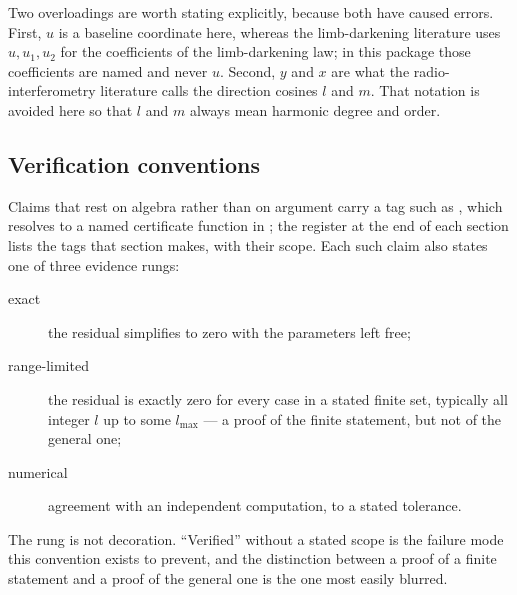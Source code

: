 Two overloadings are worth stating explicitly, because both have caused errors.
First, $u$ is a baseline coordinate here, whereas the limb-darkening literature
uses $u, u_1, u_2$ for the coefficients of the limb-darkening law; in this
package those coefficients are named  and never $u$.  Second,
$y$ and $x$ are what the radio-interferometry literature calls the direction
cosines $l$ and $m$.  That notation is avoided here so that $l$ and $m$ always
mean harmonic degree and order.

\subsection{Verification conventions}

Claims that rest on algebra rather than on argument carry a tag such as
, which resolves to a named certificate function in
; the register at the end of each section lists the tags that
section makes, with their scope.  Each such claim also states one of three evidence rungs:

\begin{description}
\item[exact] the residual simplifies to zero with the parameters left free;
\item[range-limited] the residual is exactly zero for every case in a stated
  finite set, typically all integer $l$ up to some $l_{\max}$ --- a proof of the
  finite statement, but not of the general one;
\item[numerical] agreement with an independent computation, to a stated
  tolerance.
\end{description}

The rung is not decoration.  ``Verified'' without a stated scope is the failure
mode this convention exists to prevent, and the distinction between a proof of a
finite statement and a proof of the general one is the one most easily blurred.
